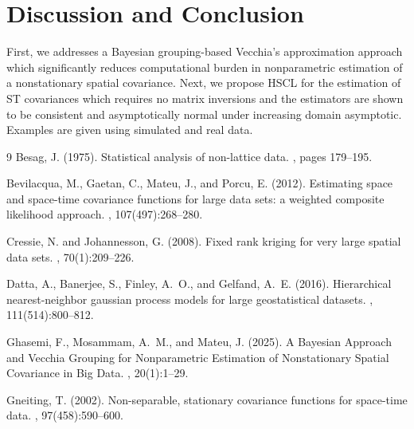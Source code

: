 \documentclass[twoside]{article}
\renewcommand{\/}[1]{\mathbf{\boldsymbol{#1}}}
\begin{document}
\section*{Discussion and Conclusion}   
First, we  addresses a Bayesian grouping-based  Vecchia’s approximation approach which significantly reduces computational burden in nonparametric estimation of a nonstationary spatial covariance.  Next, we propose HSCL   for the estimation of ST covariances which requires no matrix inversions and
the estimators are shown to be consistent and asymptotically normal under increasing domain asymptotic. Examples are given using simulated and real data.
\begin{thebibliography}{9}
Besag, J. (1975).
\newblock Statistical analysis of non-lattice data.
, pages 179--195.

Bevilacqua, M., Gaetan, C., Mateu, J., and Porcu, E. (2012).
\newblock Estimating space and space-time covariance functions for large data
  sets: a weighted composite likelihood approach.
,
  107(497):268--280.


Cressie, N. and Johannesson, G. (2008).
\newblock Fixed rank kriging for very large spatial data sets.
, 70(1):209--226.


Datta, A., Banerjee, S., Finley, A.~O., and Gelfand, A.~E. (2016).
\newblock Hierarchical nearest-neighbor gaussian process models for large
  geostatistical datasets.
,
  111(514):800--812.


%  
Ghasemi, F., Mosammam, A.~M., and Mateu, J. (2025).
\newblock A Bayesian Approach and Vecchia Grouping for Nonparametric Estimation of Nonstationary Spatial Covariance in Big Data.
, 20(1):1--29.

 
Gneiting, T. (2002).
\newblock Non-separable, stationary covariance functions for space-time data.
,
  97(458):590--600.
%



\end{thebibliography}
\end{document}
